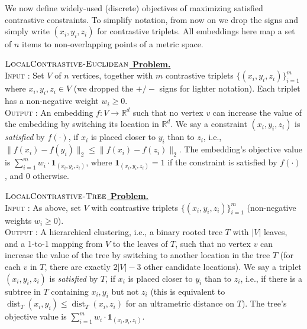 \documentclass{article}
\theoremstyle{definition}  %
\theoremstyle{plain}
\numberwithin{observation}{section}
\numberwithin{claim}{section}
\numberwithin{fact}{section}
\numberwithin{lemma}{section}
\numberwithin{proposition}{section}
\numberwithin{theorem}{section}
\numberwithin{corollary}{section}
\numberwithin{definition}{section}
\DeclareMathOperator{\dist}{dist}
\newcommand{\x}{x}
\newcommand{\y}{y}
\newcommand{\z}{z}
\newcommand{\anc}{\x}
\newcommand{\pos}{\y}
\renewcommand{\neg}{\z}
\newenvironment{nproblem}[1][\unskip]{%
  \medskip
  \begin{mdframed}
  \noindent
  \textbf{\underline{$#1$ Problem.}} \\
  \noindent
}{%
  \end{mdframed}
  \medskip %
}
\theoremstyle{plain}
\begin{document}
We now define widely-used (discrete) objectives of maximizing satisfied contrastive constraints. To simplify notation, from now on we drop the signs and simply write $(\anc_i, \pos_i, \neg_{i})$ for contrastive triplets. All embeddings here  map a set of $n$ items to non-overlapping points of a metric space.%


\begin{nproblem}[\textsc{LocalContrastive-Euclidean}] \label{def:local-euclidean}
\textsc{Input :} Set $V$ of $n$ vertices, together with $m$ contrastive triplets $\{(\anc_i, \pos_i, \neg_{i})\}_{i = 1}^m$ where $x_i,y_i,z_i\in V$ (we dropped the $+/-$ signs for lighter notation). Each triplet has a non-negative weight $w_i \ge 0$.
\\
  \noindent \textsc{Output :}  An embedding $f: V \to \mathbb{R}^d$ such that no vertex $v$ can increase the value of the embedding by switching its location in $\mathbb{R}^d$. We say a constraint $(x_i, y_i, z_i)$ is \emph{satisfied} by $f(\cdot)$, if $x_i$ is placed closer to $y_i$ than to $z_i$, i.e.,  $\|f(x_i) - f(y_i)\|_2 \leq \|f(x_i) - f(z_i)\|_2$. The embedding's objective value is $\sum_{i=1}^m w_i \cdot \mathbf{1}_{(x_i, y_i, z_i)}$, where $\mathbf{1}_{(x_i, y_i, z_i)} = 1$ if the constraint is satisfied by $f(\cdot)$, and 0 otherwise.
\end{nproblem}


\begin{nproblem}[\textsc{LocalContrastive-Tree}] \label{def:local-tree}
\textsc{Input :}  As above, set $V$  with contrastive triplets $\{(\anc_i, \pos_i, \neg_{i})\}_{i = 1}^m$ (non-negative weights $w_i \ge 0$).
\\
  \noindent \textsc{Output :}  A hierarchical clustering, i.e., a binary rooted tree $T$ with $|V|$ leaves, and a 1-to-1 mapping from $V$ to the leaves of $T$, such that no vertex $v$ can increase the value of the tree by switching to another location in the tree $T$ (for each $v$ in $T$, there are exactly $2|V|-3$ other candidate locations). We say a triplet $(x_i, y_i, z_i)$ is \emph{satisfied} by $T$, if $x_i$ is placed closer to $y_i$ than to $z_i$, i.e., if there is a subtree in $T$ containing $x_i,y_i$ but not $z_i$ (this is equivalent to $\dist_T(x_i,y_i)\le\dist_T(x_i,z_i)$ for an ultrametric distance on $T$). The tree's objective value is $\sum_{i=1}^m w_i \cdot \mathbf{1}_{(x_i, y_i, z_i)}$.
\end{nproblem}
\end{document}
